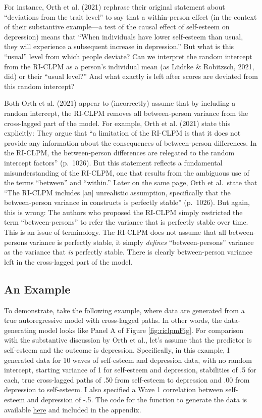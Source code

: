 \documentclass[
  english,
  man,floatsintext]{apa6}
\begin{document}
For instance, Orth et al. (2021) rephrase their original statement about ``deviations from the trait level'' to say that a within-person effect (in the context of their substantive example---a test of the causal effect of self-esteem on depression) means that ``When individuals have lower self-esteem than usual, they will experience a subsequent increase in depression.'' But what is this ``usual'' level from which people deviate? Can we interpret the random intercept from the RI-CLPM as a person's individual mean (as Lüdtke \& Robitzsch, 2021, did) or their ``usual level?'' And what exactly is left after scores are deviated from this random intercept?

Both Orth et al. (2021) appear to (incorrectly) assume that by including a random intercept, the RI-CLPM removes all between-person variance from the cross-lagged part of the model. For example, Orth et al. (2021) state this explicitly: They argue that ``a limitation of the RI-CLPM is that it does not provide any information about the consequences of between-person differences. In the RI-CLPM, the between-person differences are relegated to the random intercept factors'' (p.~1026). But this statement reflects a fundamental misunderstanding of the RI-CLPM, one that results from the ambiguous use of the terms ``between'' and ``within.'' Later on the same page, Orth et al.~state that ``The RI-CLPM includes {[}an{]} unrealistic assumption, specifically that the between-person variance in constructs is perfectly stable'' (p.~1026). But again, this is wrong: The authors who proposed the RI-CLPM simply restricted the term ``between-persons'' to refer the variance that is perfectly stable over time. This is an issue of terminology. The RI-CLPM does not assume that all between-persons variance is perfectly stable, it simply \emph{defines} ``between-persons'' variance as the variance that \emph{is} perfectly stable. There is clearly between-person variance left in the cross-lagged part of the model.

\hypertarget{an-example}{%
\subsection{An Example}\label{an-example}}

To demonstrate, take the following example, where data are generated from a true autoregressive model with cross-lagged paths. In other words, the data-generating model looks like Panel A of Figure \ref{fig:riclpmFig}. For comparison with the substantive discussion by Orth et al., let's assume that the predictor is self-esteem and the outcome is depression. Specifically, in this example, I generated data for 10 waves of self-esteem and depression data, with no random intercept, starting variance of 1 for self-esteem and depression, stabilities of .5 for each, true cross-lagged paths of .50 from self-esteem to depression and .00 from depression to self-esteem. I also specified a Wave 1 correlation between self-esteem and depression of -.5. The code for the function to generate the data is available \href{https://github.com/rlucas11/starts/blob/main/gen_starts.R}{here} and included in the appendix.
\end{document}
